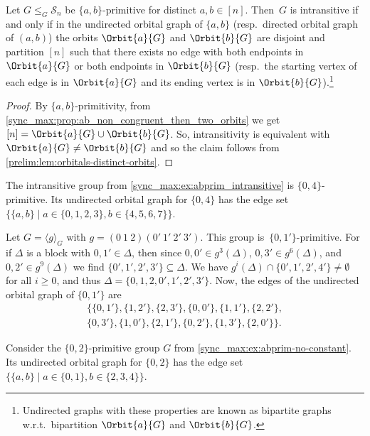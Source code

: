\begin{proposition}
	\label{syncmax:prop:abprim_undirectedorbital_intransitive}
	Let $G \le_G \mathcal S_n$  be $\{a,b\}$-primitive for distinct $a,b \in [n]$.
	Then~$G$ is intransitive if and only if
	in the undirected orbital graph of $\{a,b\}$ (resp.~directed orbital graph of $(a,b)$)
	the orbits $\Orbit{a}{G}$ and $\Orbit{b}{G}$ are disjoint
	and partition $[n]$ such that there exists no edge with both 
	endpoints in $\Orbit{a}{G}$
	or both endpoints in $\Orbit{b}{G}$
	(resp.~the starting vertex of each edge is in $\Orbit{a}{G}$ 
	and its ending vertex is in $\Orbit{b}{G}$).\footnote{Undirected graphs with these properties are known as bipartite
		graphs w.r.t.~bipartition $\Orbit{a}{G}$ and $\Orbit{b}{G}$.} 
\end{proposition}
\begin{proof}
	By $\{a,b\}$-primitivity, from 
	\cref{sync_max:prop:ab_non_congruent_then_two_orbits} 
	we get $[n] = \Orbit{a}{G} \cup \Orbit{b}{G}$.
	So, intransitivity 
	is equivalent with $\Orbit{a}{G} \ne \Orbit{b}{G}$
	and so the claim follows from \cref{prelim:lem:orbitals-distinct-orbits}.
\end{proof}

\begin{example}
	The intransitive group from \cref{sync_max:ex:abprim_intransitive} 
	is $\{0,4\}$-primitive.
	Its undirected orbital graph for $\{0,4\}$
	has the edge set $\{ \{ a,b \} \mid a \in \{0,1,2,3\}, b \in \{4,5,6,7\} \}$.		
\end{example} 

\begin{example}
	Let $G = \langle g \rangle_G$ with $g = (0 ~ 1 ~ 2)(0' ~ 1' ~ 2' ~3')$.
	This group is~$\{0,1'\}$-primitive.
	For if $\Delta$ is a block with $0,1' \in \Delta$,
	then since $0,0' \in g^3(\Delta)$, $0,3' \in g^6(\Delta)$,
	and $0, 2' \in g^9(\Delta)$
	we find $\{0',1',2',3'\} \subseteq \Delta$.
	We have $g^i(\Delta) \cap \{0',1',2',4'\} \ne \emptyset$
	for all $i \ge 0$, and thus $\Delta = \{0,1,2,0',1',2',3'\}$.
	Now, the edges of the undirected orbital graph of $\{0,1'\}$
	are
	\begin{multline*}
		\{ \{0,1'\}, \{1,2'\}, \{2,3'\},
		\{0,0'\}, \{1,1'\}, \{2,2'\}, \\
		\{0,3'\}, \{1,0'\}, \{2,1'\},
		\{0,2'\}, \{1,3'\}, \{2,0'\} \}.
	\end{multline*}
\end{example}

\begin{example}\label{sync_max:ex:abprim-no-constant0}
	Consider the $\{0,2\}$-primitive group $G$ from \cref{sync_max:ex:abprim-no-constant}.
	Its undirected orbital graph for $\{0,2\}$
	has the edge set $\{ \{ a,b \} \mid a \in \{0,1\}, b \in \{2,3,4\} \}$.		
\end{example}
